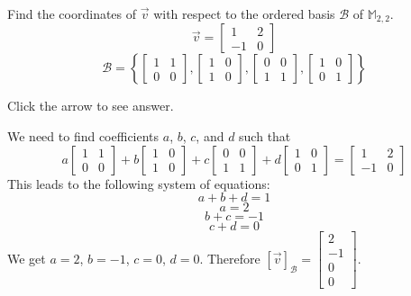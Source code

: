 \documentclass{ximera}
\begin{document}
\begin{problem}\label{prob:basisWRTB}
    Find the coordinates of $\vec{v}$ with respect to the ordered basis $\mathcal{B}$ of $\mathbb{M}_{2,2}$.
    $$\vec{v}=\begin{bmatrix}1 &2\\-1&0\end{bmatrix}$$
    $$\mathcal{B}=\left\{\begin{bmatrix}1&1\\0&0\end{bmatrix}, \begin{bmatrix}1&0\\1&0\end{bmatrix}, \begin{bmatrix}0&0\\1&1\end{bmatrix}, \begin{bmatrix}1&0\\0&1\end{bmatrix}\right\}$$

    Click the arrow to see answer.

    \begin{expandable}
        We need to find coefficients $a$, $b$, $c$, and $d$ such that
        $$a\begin{bmatrix}1&1\\0&0\end{bmatrix}+ b\begin{bmatrix}1&0\\1&0\end{bmatrix}+ c\begin{bmatrix}0&0\\1&1\end{bmatrix}+ d\begin{bmatrix}1&0\\0&1\end{bmatrix}=\begin{bmatrix}1 &2\\-1&0\end{bmatrix}$$
        This leads to the following system of equations:
        $$a+b+d=1$$
        $$a=2$$
        $$b+c=-1$$
        $$c+d=0$$
        We get $a=2$, $b=-1$, $c=0$, $d=0$.  Therefore $[\vec{v}]_{\mathcal{B}}=\begin{bmatrix}2\\-1\\0\\0\end{bmatrix}$.
    \end{expandable}
\end{problem}
\end{document}
